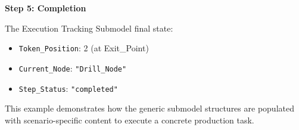 \textbf{Step 5: Completion}

The Execution Tracking Submodel final state:
\begin{itemize}
    \item \texttt{Token\_Position}: 2 (at Exit\_Point)
    \item \texttt{Current\_Node}: \texttt{"Drill\_Node"}
    \item \texttt{Step\_Status}: \texttt{"completed"}
\end{itemize}

This example demonstrates how the generic submodel structures are populated with scenario-specific content to execute a concrete production task.
